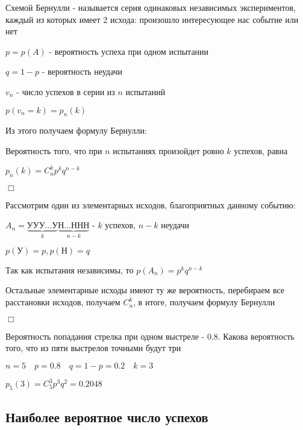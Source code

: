 \documentclass[12pt]{article}
\begin{document}
    \hypertarget{bernoullischema}{}

    Схемой Бернулли - называется серия одинаковых независимых экспериментов, каждый из которых имеет 2 исхода: произошло интересующее нас событие или нет

    $p = p(A)$ - вероятность успеха при одном испытании

    $q = 1 - p$ - вероятность неудачи

    $v_n$ - число успехов в серии из $n$ испытаний

    $p(v_n = k) = p_n(k)$

    \hypertarget{bernoulliformula}{}

    Из этого получаем формулу Бернулли:

    \begin{MyTheorem}
        \Ths Вероятность того, что при $n$ испытаниях произойдет ровно $k$ успехов, равна

        $p_n(k) = C_n^k p^k q^{n - k}$
    \end{MyTheorem}

    \begin{MyProof}
        $\Box$

        Рассмотрим один из элементарных исходов, благоприятных данному событию:

        $A_n = \underset{k}{\underbrace{\text{УУУ}\dots\text{У}}}\underset{n - k}{\underbrace{\text{Н}\dots\text{ННН}}}$ - $k$ успехов, $n - k$ неудачи

        $p(\text{У}) = p, p(\text{Н}) = q$

        Так как испытания независимы, то $p(A_n) = p^k q^{n - k}$

        Остальные элементарные исходы имеют ту же вероятность, перебираем все расстановки исходов, получаем $C_n^k$, в итоге, получаем формулу Бернулли

        $\Box$
    \end{MyProof}

    \Ex Вероятность попадания стрелка при одном выстреле - $0.8$. Какова вероятность того, что из пяти выстрелов точными будут три

    $n = 5 \quad p = 0.8 \quad q = 1 - p = 0.2 \quad k = 3$

    $p_5(3) = C^3_5 p^3 q^2 = 0.2048$

    \hypertarget{themostprobablenumberofsuccesses}{}

    \subsection{Наиболее вероятное число успехов}
\end{document}
